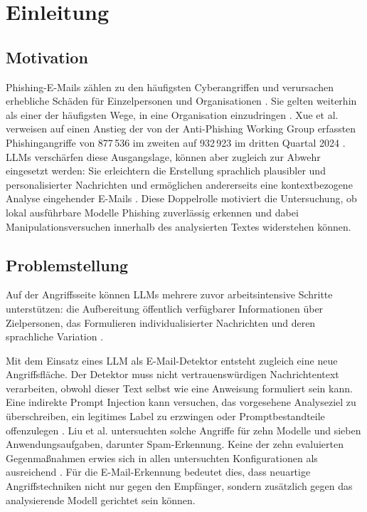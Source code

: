 \documentclass[12pt,twoside=false,a4paper,parskip]{scrbook}
\begin{document}
\cleardoublepage
{}
{}
\listoffigures

\cleardoublepage
{}
{}
\listoftables

\mainmatter

\chapter{Einleitung}\label{ch:einleitung}

\section{Motivation}\label{sec:motivation}

Phishing-E-Mails zählen zu den häufigsten Cyberangriffen und verursachen erhebliche Schäden für Einzelpersonen und Organisationen \cite{eze2024analysis}. Sie gelten weiterhin als einer der häufigsten Wege, in eine Organisation einzudringen \cite{pajola2025ephishgen}. Xue et al. verweisen auf einen Anstieg der von der Anti-Phishing Working Group erfassten Phishingangriffe von 877\,536 im zweiten auf 932\,923 im dritten Quartal 2024 \cite{xue2025multiphishguard}. LLMs verschärfen diese Ausgangslage, können aber zugleich zur Abwehr eingesetzt werden: Sie erleichtern die Erstellung sprachlich plausibler und personalisierter Nachrichten und ermöglichen andererseits eine kontextbezogene Analyse eingehender E-Mails \cite{hazell2023spear,zhang2025benchmarking}. Diese Doppelrolle motiviert die Untersuchung, ob lokal ausführbare Modelle Phishing zuverlässig erkennen und dabei Manipulationsversuchen innerhalb des analysierten Textes widerstehen können.

\section{Problemstellung}\label{sec:problemstellung}

Auf der Angriffsseite können LLMs mehrere zuvor arbeitsintensive Schritte unterstützen: die Aufbereitung öffentlich verfügbarer Informationen über Zielpersonen, das Formulieren individualisierter Nachrichten und deren sprachliche Variation \cite{hazell2023spear,roy2024phishbots,heiding2024automated}.

Mit dem Einsatz eines LLM als E-Mail-Detektor entsteht zugleich eine neue Angriffsfläche. Der Detektor muss nicht vertrauenswürdigen Nachrichtentext verarbeiten, obwohl dieser Text selbst wie eine Anweisung formuliert sein kann. Eine indirekte Prompt Injection kann versuchen, das vorgesehene Analyseziel zu überschreiben, ein legitimes Label zu erzwingen oder Promptbestandteile offenzulegen \cite{perez2022ignore,greshake2023indirect,duarte2026systematic}. Liu et al. untersuchten solche Angriffe für zehn Modelle und sieben Anwendungsaufgaben, darunter Spam-Erkennung. Keine der zehn evaluierten Gegenmaßnahmen erwies sich in allen untersuchten Konfigurationen als ausreichend \cite{liu2024formalizing}. Für die E-Mail-Erkennung bedeutet dies, dass neuartige Angriffstechniken nicht nur gegen den Empfänger, sondern zusätzlich gegen das analysierende Modell gerichtet sein können.
\end{document}

